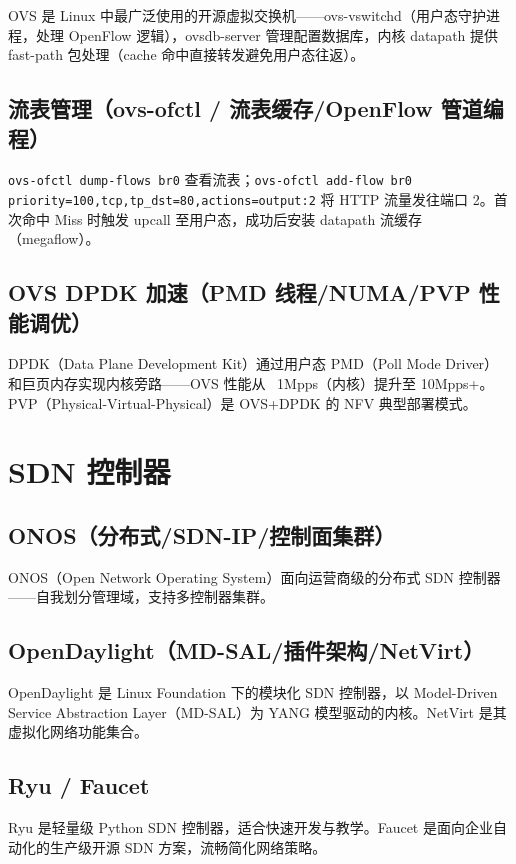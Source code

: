 \documentclass[12pt,UTF8]{ctexbook}
\begin{document}
OVS 是 Linux 中最广泛使用的开源虚拟交换机——ovs-vswitchd（用户态守护进程，处理 OpenFlow 逻辑），ovsdb-server 管理配置数据库，内核 datapath 提供 fast-path 包处理（cache 命中直接转发避免用户态往返）。

    \subsection{流表管理（ovs-ofctl / 流表缓存/OpenFlow 管道编程）}

\verb|ovs-ofctl dump-flows br0| 查看流表；\verb|ovs-ofctl add-flow br0 priority=100,tcp,tp_dst=80,actions=output:2| 将 HTTP 流量发往端口 2。首次命中 Miss 时触发 upcall 至用户态，成功后安装 datapath 流缓存（megaflow）。

    \subsection{OVS DPDK 加速（PMD 线程/NUMA/PVP 性能调优）}

DPDK（Data Plane Development Kit）通过用户态 PMD（Poll Mode Driver）和巨页内存实现内核旁路——OVS 性能从 ~1Mpps（内核）提升至 10Mpps+。PVP（Physical-Virtual-Physical）是 OVS+DPDK 的 NFV 典型部署模式。

  \section{SDN 控制器}
    \subsection{ONOS（分布式/SDN-IP/控制面集群）}

ONOS（Open Network Operating System）面向运营商级的分布式 SDN 控制器——自我划分管理域，支持多控制器集群。

    \subsection{OpenDaylight（MD-SAL/插件架构/NetVirt）}

OpenDaylight 是 Linux Foundation 下的模块化 SDN 控制器，以 Model-Driven Service Abstraction Layer（MD-SAL）为 YANG 模型驱动的内核。NetVirt 是其虚拟化网络功能集合。

    \subsection{Ryu / Faucet}

Ryu 是轻量级 Python SDN 控制器，适合快速开发与教学。Faucet 是面向企业自动化的生产级开源 SDN 方案，流畅简化网络策略。
\end{document}
